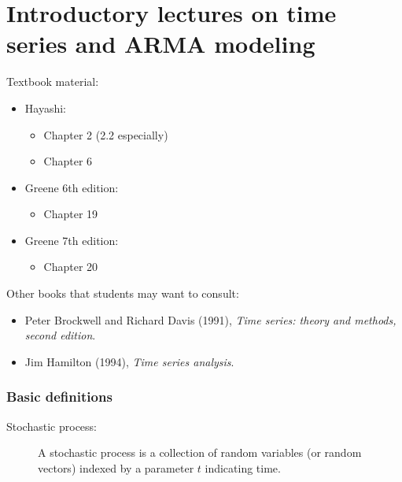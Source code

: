% 

\part*{Introductory lectures on time series and ARMA modeling}

Textbook material:
\begin{itemize}
\item Hayashi:
  \begin{itemize}
  \item Chapter 2 (2.2 especially)
  \item Chapter 6
  \end{itemize}
\item Greene 6th edition:
  \begin{itemize}
  \item Chapter 19
  \end{itemize}
\item Greene 7th edition:
  \begin{itemize}
  \item Chapter 20
  \end{itemize}
\end{itemize}

Other books that students may want to consult:
\begin{itemize}
\item Peter Brockwell and Richard Davis (1991), \emph{Time series:
    theory and methods, second edition}.
\item Jim Hamilton (1994), \emph{Time series analysis}.
\end{itemize}

\section{Basic definitions}

\begin{description}
\item[Stochastic process:]
A stochastic process is a collection of random variables (or
random vectors) indexed by a parameter $t$ indicating time.
\end{description}

